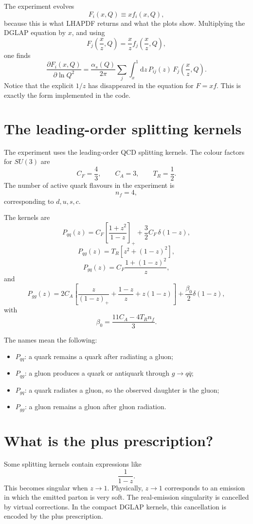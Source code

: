 \documentclass[11pt]{article}
\newcommand{\dd}{\mathrm{d}}
\newcommand{\as}{\alpha_s}
\begin{document}
The experiment evolves
\[
  F_i(x,Q) \equiv x f_i(x,Q),
\]
because this is what LHAPDF returns and what the plots show.  Multiplying the
DGLAP equation by \(x\), and using
\[
  F_j\left(\frac{x}{z},Q\right)
  =
  \frac{x}{z}
  f_j\left(\frac{x}{z},Q\right),
\]
one finds
\[
  \frac{\partial F_i(x,Q)}{\partial \ln Q^2}
  =
  \frac{\as(Q)}{2\pi}
  \sum_j
  \int_x^1
  \dd z\,
  P_{ij}(z)\,
  F_j\left(\frac{x}{z},Q\right).
\]
Notice that the explicit \(1/z\) has disappeared in the equation for \(F=x f\).
This is exactly the form implemented in the code.

\section{The leading-order splitting kernels}

The experiment uses the leading-order QCD splitting kernels.  The colour
factors for \(SU(3)\) are
\[
  C_F=\frac{4}{3}, \qquad C_A=3, \qquad T_R=\frac{1}{2}.
\]
The number of active quark flavours in the experiment is
\[
  n_f=4,
\]
corresponding to \(d,u,s,c\).

The kernels are
\[
  P_{qq}(z)
  =
  C_F
  \left[
    \frac{1+z^2}{1-z}
    \right]_+
  +
  \frac{3}{2}C_F\,\delta(1-z),
\]
\[
  P_{qg}(z)
  =
  T_R\left[z^2+(1-z)^2\right],
\]
\[
  P_{gq}(z)
  =
  C_F
  \frac{1+(1-z)^2}{z},
\]
and
\[
  P_{gg}(z)
  =
  2C_A
  \left[
    \frac{z}{(1-z)_+}
    +
    \frac{1-z}{z}
    +
    z(1-z)
    \right]
  +
  \frac{\beta_0}{2}\delta(1-z),
\]
with
\[
  \beta_0 = \frac{11C_A-4T_R n_f}{3}.
\]

The names mean the following:
\begin{itemize}
  \item \(P_{qq}\): a quark remains a quark after radiating a gluon;
  \item \(P_{qg}\): a gluon produces a quark or antiquark through
        \(g\to q\bar q\);
  \item \(P_{gq}\): a quark radiates a gluon, so the observed daughter is the
        gluon;
  \item \(P_{gg}\): a gluon remains a gluon after gluon radiation.
\end{itemize}

\section{What is the plus prescription?}

Some splitting kernels contain expressions like
\[
  \frac{1}{1-z}.
\]
This becomes singular when \(z\to1\).  Physically, \(z\to1\) corresponds to an
emission in which the emitted parton is very soft.  The real-emission
singularity is cancelled by virtual corrections.  In the compact DGLAP kernels,
this cancellation is encoded by the plus prescription.
\end{document}
